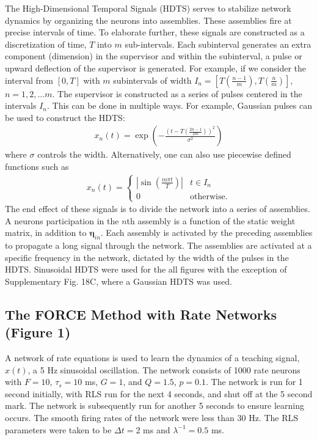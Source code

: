 \documentclass[11pt]{article} %
\begin{document}
The High-Dimensional Temporal Signals (HDTS) serves to stabilize 
network dynamics by organizing the neurons into assemblies.  
These assemblies fire at precise intervals of time.   
To elaborate further, these signals are constructed as a 
discretization of time, $T$ into $m$ sub-intervals.   
Each subinterval generates an extra component (dimension) in the supervisor 
and within the subinterval, a pulse or upward deflection of the 
supervisor is generated.  For example, if we consider the interval 
from $[0,T]$ with $m$ subintervals of width 
$I_n = [T\left(\frac{n-1}{m}\right),T\left(\frac{n}{m}\right)]$, $n=1,2,\ldots m$.  
The supervisor is constructed as a series of pulses centered in the intervals $I_n$.  
This can be done in multiple ways.  For example, Gaussian pulses 
can be used to construct the HDTS:
\begin{eqnarray}
x_n(t) = \exp\left(-\frac{\left(t - T\left(\frac{2n-1}{2m} \right)\right)^2}{\sigma^2} \right)
\end{eqnarray}
where $\sigma$ controls the width.  Alternatively, 
one can also use piecewise defined functions such as
\begin{eqnarray}
x_n(t) = \begin{cases} |\sin(\frac{m\pi t}{T})| & t\in I_n\\ 0 & \text{otherwise}. \end{cases}
\end{eqnarray}
The end effect of these signals is to divide the network into a series of assemblies.  
A neurons participation in the $n$th assembly is a function of the static weight matrix, 
in addition to $\bm \eta_{in}$.  Each assembly is activated by the preceding assemblies 
to propagate a long signal through the network.  The assemblies are activated at a specific 
frequency in the network, dictated by the width of the pulses in the HDTS.  
Sinusoidal HDTS were used for the all figures with the exception of Supplementary 
Fig. 18C, where a Gaussian HDTS was used.    



\subsection*{The FORCE Method with Rate Networks (Figure 1) }
A network of rate equations is used to learn the dynamics of a teaching signal, $x(t)$, 
a 5 Hz sinusoidal oscillation.  The network consists of 1000 rate neurons with $F = 10$, 
$\tau_s = 10$ ms, $G=1$, and $Q=1.5$, $p=0.1$.    
The network is run for 1 second initially, with RLS run for the next 4 seconds, 
and shut off at the 5 second mark.  The network is subsequently run for another 5 seconds 
to ensure learning occurs.   The smooth firing rates of the network were less than 30 Hz.  
The RLS parameters were taken to be $\Delta t = 2$ ms and $\lambda^{-1} =  0.5$ ms.  
\end{document}
